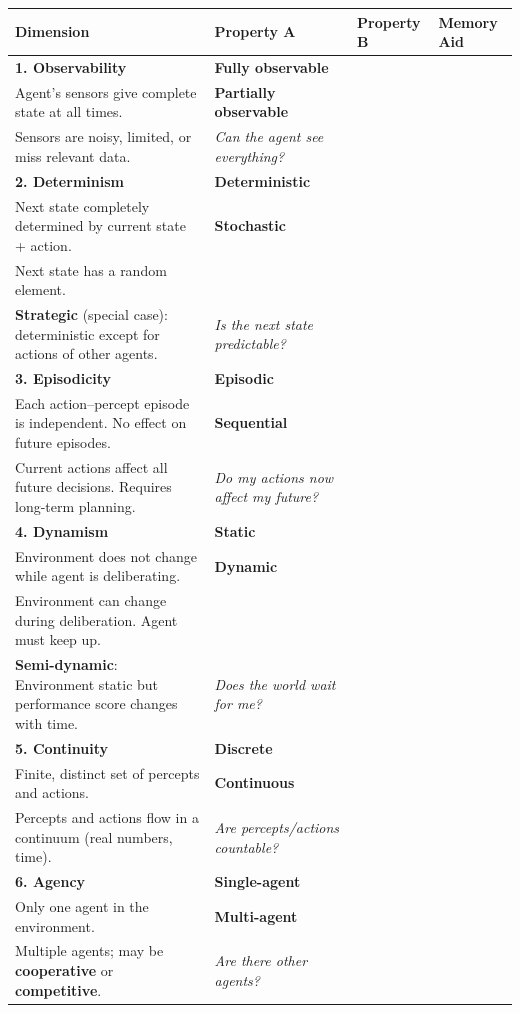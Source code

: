 \documentclass[12pt, a4paper]{article}
\begin{document}
\begin{center}
\renewcommand{\arraystretch}{1.5}
\begin{tabular}{l|p{5cm}|p{5cm}|p{5cm}}
\toprule
\textbf{Dimension} & \textbf{Property A} & \textbf{Property B} & \textbf{Memory Aid} \\
\midrule
\textbf{1. Observability} &
  \textbf{Fully observable} \\
  Agent's sensors give complete state at all times. &
  \textbf{Partially observable} \\
  Sensors are noisy, limited, or miss relevant data. &
  \emph{Can the agent see everything?} \\
\midrule
\textbf{2. Determinism} &
  \textbf{Deterministic} \\
  Next state completely determined by current state + action. &
  \textbf{Stochastic} \\
  Next state has a random element. \\
  \textbf{Strategic} (special case): deterministic except for actions of other agents. &
  \emph{Is the next state predictable?} \\
\midrule
\textbf{3. Episodicity} &
  \textbf{Episodic} \\
  Each action–percept episode is independent. No effect on future episodes. &
  \textbf{Sequential} \\
  Current actions affect all future decisions. Requires long-term planning. &
  \emph{Do my actions now affect my future?} \\
\midrule
\textbf{4. Dynamism} &
  \textbf{Static} \\
  Environment does not change while agent is deliberating. &
  \textbf{Dynamic} \\
  Environment can change during deliberation. Agent must keep up. \\
  \textbf{Semi-dynamic}: Environment static but performance score changes with time. &
  \emph{Does the world wait for me?} \\
\midrule
\textbf{5. Continuity} &
  \textbf{Discrete} \\
  Finite, distinct set of percepts and actions. &
  \textbf{Continuous} \\
  Percepts and actions flow in a continuum (real numbers, time). &
  \emph{Are percepts/actions countable?} \\
\midrule
\textbf{6. Agency} &
  \textbf{Single-agent} \\
  Only one agent in the environment. &
  \textbf{Multi-agent} \\
  Multiple agents; may be \textbf{cooperative} or \textbf{competitive}. &
  \emph{Are there other agents?} \\
\bottomrule
\end{tabular}
\end{center}
\end{document}
